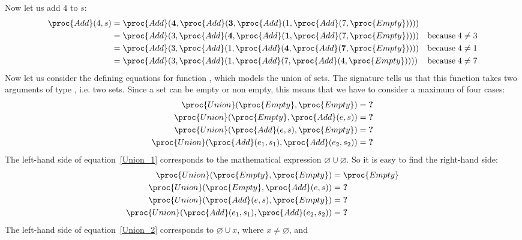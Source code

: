    Now let us add \(4\) to \(s\):
   \begin{align*}
       \proc{Add} (4, s) 
    &= \proc{Add} (\mathbf{4}, \proc{Add} (\mathbf{3},
       \proc{Add} (1, \proc{Add} (7, \proc{Empty}))))\\
    &= \proc{Add} (3, \proc{Add} (\mathbf{4}, 
       \proc{Add} (\mathbf{1}, \proc{Add} (7, \proc{Empty}))))
    & \text{because} \; 4 \neq 3\\
    &= \proc{Add} (3, \proc{Add} (1, 
       \proc{Add} (\mathbf{4}, \proc{Add} (\mathbf{7},
       \proc{Empty}))))
    & \text{because} \; 4 \neq 1\\
    &= \proc{Add} (3, \proc{Add} (1, 
       \proc{Add} (7, \proc{Add} (4, \proc{Empty}))))
    & \text{because} \; 4 \neq 7
   \end{align*}
   Now let us consider the defining equations for function
   , which models the union of sets. The signature tells
   us that this function takes two arguments of type ,
   i.e. two sets. Since a set can be empty or non empty, this means
   that we have to consider a maximum of four cases:
   \begin{align}
        \proc{Union} (\proc{Empty}, \proc{Empty}) 
     &= \textbf{?} \label{Union_1}\\
        \proc{Union} (\proc{Empty}, \proc{Add} (e, s))
     &= \textbf{?} \label{Union_2}\\
        \proc{Union} (\proc{Add} (e, s), \proc{Empty})
     &= \textbf{?} \label{Union_3}\\
        \proc{Union} (\proc{Add} (e_1, s_1), 
                      \proc{Add} (e_2, s_2))
     &= \textbf{?} \label{Union_4}
   \end{align}
   The left-hand side of equation~\ref{Union_1} corresponds to the
   mathematical expression \(\varnothing \cup \varnothing\). So it is
   easy to find the right-hand side:
   \begin{align*}
        \proc{Union} (\proc{Empty}, \proc{Empty}) 
     &= \proc{Empty}\\
        \proc{Union} (\proc{Empty}, \proc{Add} (e, s))
     &= \textbf{?}\\
        \proc{Union} (\proc{Add} (e, s), \proc{Empty})
     &= \textbf{?} \\
        \proc{Union} (\proc{Add} (e_1, s_1), 
                      \proc{Add} (e_2, s_2))
     &= \textbf{?}
   \end{align*}
   The left-hand side of equation~\ref{Union_2} corresponds to
   \(\varnothing \cup x\), where \(x \neq \varnothing\), and
